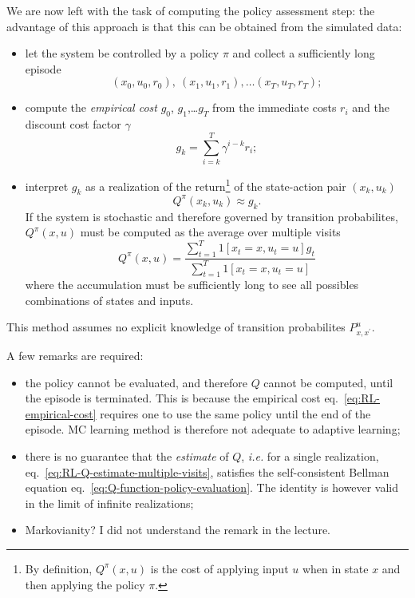 We are now left with the task of computing the policy assessment step: the advantage of this approach is that this can be obtained from the simulated data:
\begin{itemize}
\item let the system be controlled by a policy $\pi$ and collect a sufficiently long episode
  \begin{equation*}
    (x_0,u_0,r_0),\ (x_1,u_1,r_1),\ldots (x_T,u_T,r_T);
  \end{equation*}
\item compute the \emph{empirical cost} $g_0$, $g_1$,\ldots $g_T$ from the immediate costs $r_i$ and the discount cost factor $\gamma$
  \begin{equation}
    \label{eq:RL-empirical-cost}
    g_k = \sum_{i=k}^T \gamma^{i-k}r_i;
  \end{equation}
\item interpret $g_k$ as a realization of the return\footnote{By definition, $Q^\pi(x,u)$ is the cost of applying input $u$ when in state $x$ and then applying the policy $\pi$.} of the state-action pair $(x_k,u_k)$
  \begin{equation*}
    Q^\pi(x_k,u_k) \approx g_k.
  \end{equation*}
  If the system is stochastic and therefore governed by transition probabilites, $Q^\pi(x,u)$ must be computed as the average over multiple visits
  \begin{equation}
    \label{eq:RL-Q-estimate-multiple-visits}
    Q^\pi(x,u) = \frac{\sum_{t=1}^T 1[x_t=x,u_t=u]g_t}{\sum_{t=1}^T 1[x_t=x,u_t=u]}
  \end{equation}
  where the accumulation must be sufficiently long to see all possibles combinations of states and inputs.
\end{itemize}
This method assumes no explicit knowledge of transition probabilites $P_{x,x^\prime}^u$.

A few remarks are required:
\begin{itemize}
\item the policy cannot be evaluated, and therefore $Q$ cannot be computed, until the episode is terminated. This is because the empirical cost eq.~\eqref{eq:RL-empirical-cost} requires one to use the same policy until the end of the episode. MC learning method is therefore not adequate to adaptive learning;
\item there is no guarantee that the \emph{estimate} of $Q$, \textit{i.e.} for a single realization, eq.~\eqref{eq:RL-Q-estimate-multiple-visits}, satisfies the self-consistent Bellman equation eq.~\eqref{eq:Q-function-policy-evaluation}. The identity is however valid in the limit of infinite realizations;
\item Markovianity? I did not understand the remark in the lecture.
\end{itemize}

